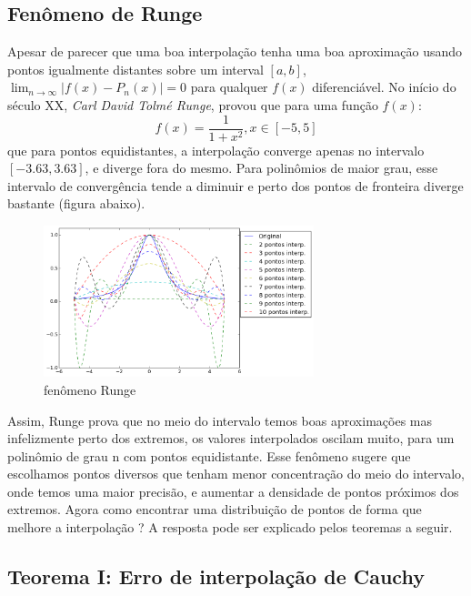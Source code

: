 \pagebreak
\newpage

\subsection{Fenômeno de Runge}
 Apesar de parecer que uma boa interpolação tenha uma boa aproximação usando pontos igualmente distantes sobre um interval $[a,b]$, $\lim_{n \rightarrow \infty} |f(x) - P_n(x)| = 0$ para qualquer $f(x)$ diferenciável.
 No início do século XX, \emph{Carl David Tolmé Runge}, provou que para uma função $f(x)$:
 \begin{equation}
 f(x) = \frac{1}{1 + x^2} , x \in [-5,5]
 \end{equation}
 que para pontos equidistantes, a interpolação converge apenas no intervalo $[-3.63,3.63]$, e diverge fora do mesmo. Para polinômios de maior grau, esse intervalo de convergência tende a diminuir e perto dos pontos de fronteira diverge bastante (figura abaixo).

\begin{figure}[htp]
\includegraphics[width=0.7\textwidth, center]{figuras/fenomeno_runge.png}
\caption{fenômeno Runge}
\end{figure}

 Assim, Runge prova que no meio do intervalo temos boas aproximações mas infelizmente perto dos extremos, os valores interpolados oscilam muito, para um polinômio de grau n com pontos equidistante. Esse fenômeno sugere que escolhamos pontos diversos que tenham menor concentração do meio do intervalo, onde temos uma maior precisão, e aumentar a densidade de pontos próximos dos extremos.
 Agora como encontrar uma distribuição de pontos de forma que melhore a interpolação ? A resposta pode ser explicado pelos teoremas a seguir.
 
\subsection{ Teorema I: Erro de interpolação de Cauchy}

